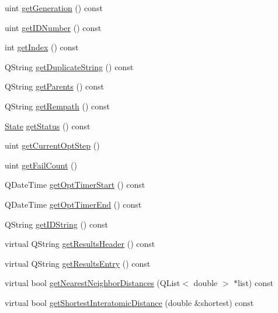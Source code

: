 \begin{DoxyCompactItemize}
\item 
uint \hyperlink{classGlobalSearch_1_1Structure_a7caa9c46c88ac5711cf9d150bd0dcbd6}{get\+Generation} () const 
\item 
uint \hyperlink{classGlobalSearch_1_1Structure_afc86429da4b4d6673a8c33a58841905d}{get\+I\+D\+Number} () const 
\item 
int \hyperlink{classGlobalSearch_1_1Structure_a73f8f57a695b3bebdea8a8b3d75e4138}{get\+Index} () const 
\item 
Q\+String \hyperlink{classGlobalSearch_1_1Structure_a495b4fd01788d6d10b3d6b138784d52d}{get\+Duplicate\+String} () const 
\item 
Q\+String \hyperlink{classGlobalSearch_1_1Structure_a0b30437b5e6cc5e6f3de9c413aa04847}{get\+Parents} () const 
\item 
Q\+String \hyperlink{classGlobalSearch_1_1Structure_a9294a602bcf48745259368025434b796}{get\+Rempath} () const 
\item 
\hyperlink{classGlobalSearch_1_1Structure_a3f1e44cb4f603fe1b3fbc8e813535917}{State} \hyperlink{classGlobalSearch_1_1Structure_ad67c972a173cddc939e3adabf65dd72b}{get\+Status} () const 
\item 
uint \hyperlink{classGlobalSearch_1_1Structure_a955a416ce3d99e5ecc0a68c23e33824c}{get\+Current\+Opt\+Step} ()
\item 
uint \hyperlink{classGlobalSearch_1_1Structure_a39a044521e91f117be11fcf9a1a562b3}{get\+Fail\+Count} ()
\item 
Q\+Date\+Time \hyperlink{classGlobalSearch_1_1Structure_a17a4bd931cc52643bb89a19c9298fc7f}{get\+Opt\+Timer\+Start} () const 
\item 
Q\+Date\+Time \hyperlink{classGlobalSearch_1_1Structure_a720cde3d4eabbeca51fd41160a89fb70}{get\+Opt\+Timer\+End} () const 
\item 
Q\+String \hyperlink{classGlobalSearch_1_1Structure_a38b039e671cdcae7eab7b976c93255de}{get\+I\+D\+String} () const 
\item 
virtual Q\+String \hyperlink{classGlobalSearch_1_1Structure_a5f4dde0d82dbf949fffd514ccb9fd7ac}{get\+Results\+Header} () const 
\item 
virtual Q\+String \hyperlink{classGlobalSearch_1_1Structure_a28886a7dbbde4d7320ea05aa6c50c2e6}{get\+Results\+Entry} () const 
\item 
virtual bool \hyperlink{classGlobalSearch_1_1Structure_ad5d59a1e8739f9cec4c39ca6d576d22a}{get\+Nearest\+Neighbor\+Distances} (Q\+List$<$ double $>$ $\ast$list) const 
\item 
virtual bool \hyperlink{classGlobalSearch_1_1Structure_adee82bcb74af1c15bb91e5a9aa0e3849}{get\+Shortest\+Interatomic\+Distance} (double \&shortest) const 

\end{DoxyCompactItemize}
